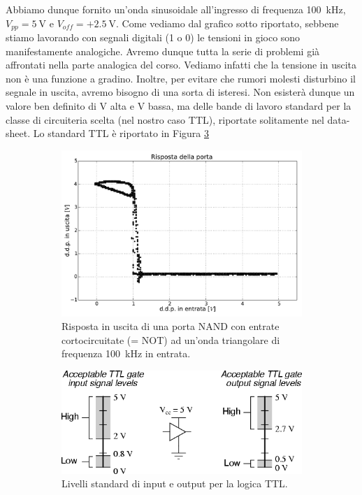 Abbiamo dunque fornito un'onda sinusoidale all'ingresso di frequenza \SI{100}{\kilo\hertz}, $V_{pp}=\SI{5}{\volt}$ e $V_{off}=+\SI{2.5}{\volt}$.
Come vediamo dal grafico sotto riportato, sebbene stiamo lavorando con segnali digitali (1 o 0) le tensioni in gioco sono manifestamente analogiche.
Avremo dunque tutta la serie di problemi già affrontati nella parte analogica del corso.
Vediamo infatti che la tensione in uscita non è una funzione a gradino.
Inoltre, per evitare che rumori molesti disturbino il segnale in uscita, avremo bisogno di una sorta di isteresi.
Non esisterà dunque un valore ben definito di V alta e V bassa, ma delle bande di lavoro standard per la classe di circuiteria scelta (nel nostro caso TTL), riportate solitamente nel data-sheet.
Lo standard TTL è riportato in Figura \ref{fig9:TTL}

\begin{figure}[htpc]
\centering
	\begin{subfigure}[hc]{0.49\textwidth}
		\centering
		\includegraphics[width=.95\textwidth]{../E09/latex/XY.pdf}
                \caption{Risposta in uscita di una porta NAND con entrate cortocircuitate (= NOT) ad un'onda triangolare di frequenza \SI{100}{\kHz} in entrata.}
                \label{fig9:XY}
        \end{subfigure}%
	\quad
        \begin{subfigure}[hc]{0.49\textwidth}
		\centering
		\includegraphics[width=.95\textwidth]{../E09/latex/TTL.png}
                \caption{Livelli standard di input e output per la logica TTL.}
                \label{fig9:TTL}
        \end{subfigure}
\caption{}
\end{figure}
\vspace{-5mm}

